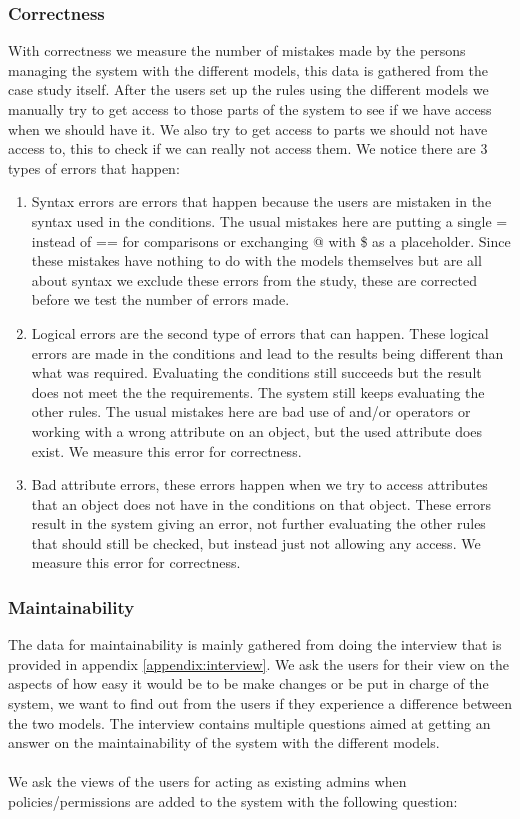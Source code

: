 \subsubsection{Correctness}
With correctness we measure the number of mistakes made by the persons managing the system with the different models, this data is gathered from the case study itself.
After the users set up the rules using the different models we manually try to get access to those parts of the system to see if we have access when we should have it.
We also try to get access to parts we should not have access to, this to check if we can really not access them.
We notice there are 3 types of errors that happen:
\begin{enumerate}
    \item Syntax errors are errors that happen because the users are mistaken in the syntax used in the conditions.
    The usual mistakes here are putting a single = instead of == for comparisons or exchanging @ with \$ as a placeholder.
    Since these mistakes have nothing to do with the models themselves but are all about syntax we exclude these errors from the study, these are corrected before we test the number of errors made.
    \item Logical errors are the second type of errors that can happen.
    These logical errors are made in the conditions and lead to the results being different than what was required.
    Evaluating the conditions still succeeds but the result does not meet the the requirements.
    The system still keeps evaluating the other rules.
    The usual mistakes here are bad use of and/or operators or working with a wrong attribute on an object, but the used attribute does exist.
    We measure this error for correctness.
    \item Bad attribute errors, these errors happen when we try to access attributes that an object does not have in the conditions on that object.
    These errors result in the system giving an error, not further evaluating the other rules that should still be checked, but instead just not allowing any access.
    We measure this error for correctness.
\end{enumerate}

\subsubsection{Maintainability}
The data for maintainability is mainly gathered from doing the interview that is provided in appendix \ref{appendix:interview}.
We ask the users for their view on the aspects of how easy it would be to be make changes or be put in charge of the system, we want to find out from the users if they experience a difference between the two models.
The interview contains multiple questions aimed at getting an answer on the maintainability of the system with the different models.
\\
\\
We ask the views of the users for acting as existing admins when policies/permissions are added to the system with the following question:
\\

